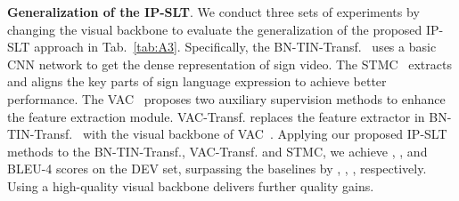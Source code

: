 \documentclass[10pt,twocolumn,letterpaper]{article}
\begin{document}
     \setlength{\tabcolsep}{5.5pt}
    \begin{table}[!t]
     \scriptsize
     \vspace{0.5mm}
     \caption{The weight  of iterative distillation loss to CE loss.}
     \label{tab:A4}
     \vspace{-1mm}
     \end{table}

    
     

     

    \smallskip
    \noindent \textbf{Generalization of the IP-SLT}. 
    We conduct three sets of experiments by changing the visual backbone to evaluate the generalization of the proposed IP-SLT approach in Tab.~\ref{tab:A3}. Specifically, the BN-TIN-Transf.~\cite{zhou2021improving} uses a basic CNN network to get the dense representation of sign video. The STMC~\cite{zhou2021spatial} extracts and aligns the key parts of sign language expression to achieve better performance. The VAC~\cite{min2021visual} proposes two auxiliary supervision methods to enhance the feature extraction module.
    VAC-Transf. replaces the feature extractor in BN-TIN-Transf.~\cite{zhou2021improving} with the visual backbone of VAC~\cite{min2021visual}.
    Applying our proposed IP-SLT methods to the BN-TIN-Transf., VAC-Transf. and STMC, we achieve , , and  BLEU-4 scores on the DEV set, surpassing the baselines by , , , respectively. Using a high-quality visual backbone delivers further quality gains.
 
\end{document}
